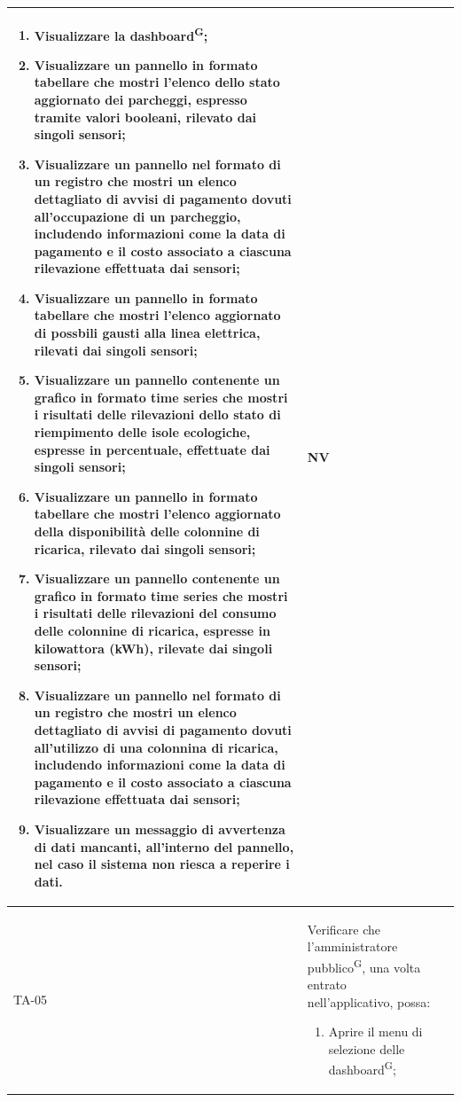 \documentclass[8pt]{article}
\newcommand{\glossterm}[1]{#1\textsuperscript{G}} %
\begin{document}
\begin{longtable}{|>{\centering}p{2cm}|>{\RaggedRight}m{12cm}|>{\centering\arraybackslash}p{2cm}|}
\begin{enumerate}
        \item Visualizzare la \glossterm{dashboard};
        \item Visualizzare un pannello in formato tabellare che mostri l'elenco dello stato aggiornato dei
            parcheggi, espresso tramite valori booleani, rilevato dai singoli sensori;
        \item Visualizzare un pannello nel formato di un registro che mostri un elenco dettagliato di
            avvisi di pagamento dovuti all'occupazione di un parcheggio, includendo informazioni come la data di pagamento e il costo
            associato a ciascuna rilevazione effettuata dai sensori;
        \item Visualizzare un pannello in formato tabellare che mostri l'elenco aggiornato di possbili gausti alla linea elettrica, rilevati dai singoli sensori;
        \item Visualizzare un pannello contenente un grafico in formato time series che mostri i
            risultati delle rilevazioni dello stato di riempimento delle isole ecologiche, espresse in percentuale, effettuate dai singoli sensori;
        \item Visualizzare un pannello in formato tabellare che mostri l'elenco aggiornato della disponibilità delle colonnine di ricarica,
            rilevato dai singoli sensori;
        \item Visualizzare un pannello contenente un grafico in formato time series che mostri i
            risultati delle rilevazioni del consumo delle colonnine di ricarica, espresse in kilowattora (kWh), rilevate dai singoli sensori;
        \item Visualizzare un pannello nel formato di un registro che mostri un elenco dettagliato di
            avvisi di pagamento dovuti all'utilizzo di una colonnina di ricarica, includendo informazioni come la data di pagamento e il costo associato a ciascuna rilevazione effettuata dai sensori;
        \item Visualizzare un messaggio di avvertenza di dati mancanti, all’interno del pannello, nel caso il sistema non riesca a reperire i dati.
    \end{enumerate}
    & NV \\
    \hline
    TA-05 & Verificare che l’\glossterm{amministratore pubblico}, una volta entrato nell'applicativo, possa:
    \begin{enumerate}
        \setlength\itemsep{0em}
        \item Aprire il menu di selezione delle \glossterm{dashboard};

\end{enumerate}
\end{longtable}
\end{document}

